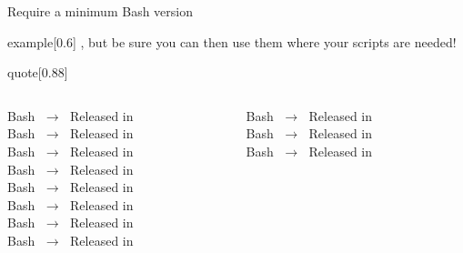 
\makeatletter
{}
\makeatother
\begin{frame}[fragile]{Require a minimum Bash version}
    \vspace{-3mm}
    \begin{varblock}{example}[0.6\textwidth]{}
        , but be sure you can then use them where your scripts are needed!
    \end{varblock}
    \vspace*{-1mm}
    \begin{varblock*}{quote}[0.88\textwidth]{}
        \normalfont
        \begin{columns}[c]
            \hfill
            \begin{column}{0.46\textwidth}
                \centering
                Bash  $\;\longrightarrow\;$ Released in \\
                Bash  $\;\longrightarrow\;$ Released in \\
                Bash  $\;\longrightarrow\;$ Released in \\
                Bash  $\;\longrightarrow\;$ Released in \\
                Bash  $\;\longrightarrow\;$ Released in \\
                Bash  $\;\longrightarrow\;$ Released in \\
                Bash  $\;\longrightarrow\;$ Released in \\
                Bash  $\;\longrightarrow\;$ Released in 
            \end{column}
            \begin{column}{0.46\textwidth}
                \centering
                Bash  $\;\longrightarrow\;$ Released in \\
                Bash  $\;\longrightarrow\;$ Released in \\
                Bash  $\;\longrightarrow\;$ Released in \\

\end{column}
\end{columns}
\end{varblock*}
\end{frame}
